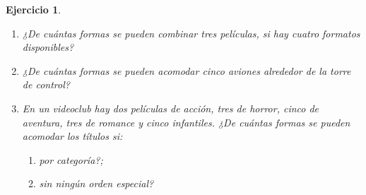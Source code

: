 \documentclass[12pt,twoside]{article}
\newtheorem{Ejer}{Ejercicio}
\begin{document}
\begin{Ejer}
\begin{enumerate}
\item ¿De cuántas formas se pueden combinar tres películas, si hay cuatro formatos disponibles?

\item ¿De cuántas formas se pueden acomodar cinco aviones alrededor de la torre de control?

\item En un videoclub hay dos películas de acción, tres de horror, cinco de aventura, tres de romance y cinco infantiles. ¿De cuántas formas se pueden acomodar los títulos si:
\begin{enumerate}
\item por categoría?;
\item sin ningún orden especial?
\end{enumerate}

\end{enumerate}
\end{Ejer}
\end{document}
